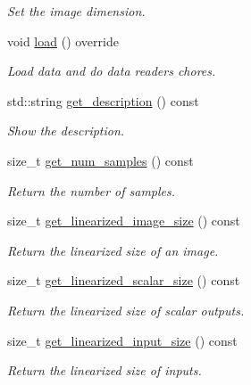 \begin{DoxyCompactItemize}
\begin{DoxyCompactList}\small\item\em Set the image dimension. \end{DoxyCompactList}\item 
void \hyperlink{classlbann_1_1data__reader__jag_a1a5c6cbbaba03f9826cbbd7657427351}{load} () override
\begin{DoxyCompactList}\small\item\em Load data and do data reader\textquotesingle{}s chores. \end{DoxyCompactList}\item 
std\+::string \hyperlink{classlbann_1_1data__reader__jag_a627474a612a158675918ec5b5518c80f}{get\+\_\+description} () const
\begin{DoxyCompactList}\small\item\em Show the description. \end{DoxyCompactList}\item 
size\+\_\+t \hyperlink{classlbann_1_1data__reader__jag_a321580d6f335308e19868b4c3d5c9558}{get\+\_\+num\+\_\+samples} () const
\begin{DoxyCompactList}\small\item\em Return the number of samples. \end{DoxyCompactList}\item 
size\+\_\+t \hyperlink{classlbann_1_1data__reader__jag_aab3760b1f7824e67f84ce486d3da399f}{get\+\_\+linearized\+\_\+image\+\_\+size} () const
\begin{DoxyCompactList}\small\item\em Return the linearized size of an image. \end{DoxyCompactList}\item 
size\+\_\+t \hyperlink{classlbann_1_1data__reader__jag_ab1060bef9fe9cbc46f36c90c1ebfd149}{get\+\_\+linearized\+\_\+scalar\+\_\+size} () const
\begin{DoxyCompactList}\small\item\em Return the linearized size of scalar outputs. \end{DoxyCompactList}\item 
size\+\_\+t \hyperlink{classlbann_1_1data__reader__jag_a2396088a5c5aac058f89702eea23b86f}{get\+\_\+linearized\+\_\+input\+\_\+size} () const
\begin{DoxyCompactList}\small\item\em Return the linearized size of inputs. \end{DoxyCompactList}\item 

\end{DoxyCompactItemize}
